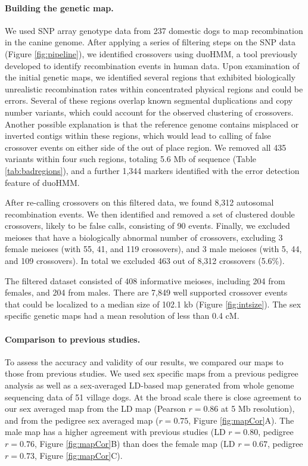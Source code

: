 \paragraph{Building the genetic map.}
We used SNP array genotype data from 237 domestic dogs to map recombination in the canine genome. 
After applying a series of filtering steps on the SNP data (Figure \ref{fig:pipeline}),
we identified crossovers using duoHMM, a tool previously developed to identify recombination events in human data\cite{OConnell2014}.
Upon examination of the initial genetic maps, we identified several regions that exhibited biologically unrealistic recombination rates within concentrated physical regions and could be errors.
Several of these regions overlap known segmental duplications and copy number variants\cite{Nicholas2009,Chen2009}, which could account for the observed clustering of crossovers.
Another possible explanation is that the reference genome contains misplaced or inverted contigs within these regions, which would lead to calling of false crossover events on either side of the out of place region.
We removed all 435 variants within four such regions, totaling 5.6 Mb of sequence (Table \ref{tab:badregions}), and
a further 1,344 markers identified with the error detection feature of duoHMM. 

After re-calling crossovers on this filtered data, we found 8,312 autosomal recombination events.
We then identified and removed a set of clustered double crossovers, likely to be false calls, consisting of 90 events.
Finally, we excluded meioses that have a biologically abnormal number of crossovers, excluding 3 female meioses (with 55, 41, and 119 crossovers), and 3 male meioses (with 5, 44, and 109 crossovers).
In total we excluded 463 out of 8,312 crossovers (5.6\%).

The filtered dataset consisted of 408 informative meioses, including 204 from females, and 204 from males.
There are 7,849 well supported crossover events that could be localized to a median size of 102.1 kb (Figure \ref{fig:intsize}).
The sex specific genetic maps had a mean resolution of less than 0.4 cM.

\paragraph{Comparison to previous studies.}
To assess the accuracy and validity of our results, we compared our maps to those from previous studies.
We used sex specific maps from a previous pedigree analysis\cite{Wong2010} as well as a sex-averaged LD-based map generated from whole genome sequencing data of 51 village dogs\cite{Auton2013}.
At the broad scale there is close agreement to our sex averaged map from the LD map (Pearson $r=0.86$ at 5 Mb resolution), and from the pedigree sex averaged map ($r=0.75$, Figure \ref{fig:mapCor}A).
The male map has a higher agreement with previous studies (LD $r=0.80$, pedigree $r=0.76$, Figure \ref{fig:mapCor}B) than does the female map (LD $r=0.67$, pedigree $r=0.73$, Figure \ref{fig:mapCor}C).

